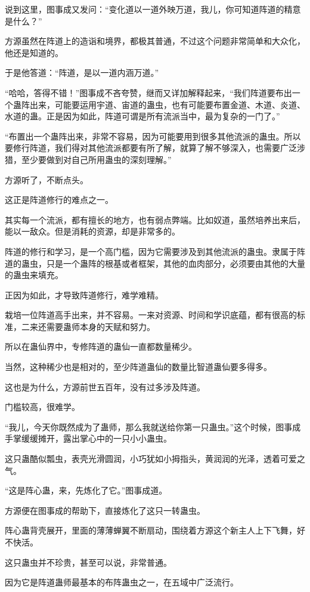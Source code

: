 \begin{this_body}
说到这里，图事成又发问：“变化道以一道外映万道，我儿，你可知道阵道的精意是什么？”

方源虽然在阵道上的造诣和境界，都极其普通，不过这个问题非常简单和大众化，他还是知道的。

于是他答道：“阵道，是以一道内涵万道。”

“哈哈，答得不错！”图事成不吝夸赞，继而又详加解释起来，“我们阵道要布出一个蛊阵出来，可能要运用宇道、宙道的蛊虫，也有可能要布置金道、木道、炎道、水道的蛊。正是因为如此，阵道可谓是所有流派当中，最为复杂的一门了。”

“布置出一个蛊阵出来，非常不容易，因为可能要用到很多其他流派的蛊虫。所以要修行阵道，我们得对其他流派都要有所了解，就算了解不够深入，也需要广泛涉猎，至少要做到对自己所用蛊虫的深刻理解。”

方源听了，不断点头。

这正是阵道修行的难点之一。

其实每一个流派，都有擅长的地方，也有弱点弊端。比如奴道，虽然培养出来后，能以一敌众。但是消耗的资源，却是非常多的。

阵道的修行和学习，是一个高门槛，因为它需要涉及到其他流派的蛊虫。隶属于阵道的蛊虫，只是一个蛊阵的根基或者框架，其他的血肉部分，必须要由其他的大量的蛊虫来填充。

正因为如此，才导致阵道修行，难学难精。

栽培一位阵道高手出来，并不容易。一来对资源、时间和学识底蕴，都有很高的标准，二来还需要蛊师本身的天赋和努力。

所以在蛊仙界中，专修阵道的蛊仙一直都数量稀少。

当然，这种稀少也是相对的，至少阵道蛊仙的数量比智道蛊仙要多得多。

这也是为什么，方源前世五百年，没有过多涉及阵道。

门槛较高，很难学。

“我儿，今天你既然成为了蛊师，那么我就送给你第一只蛊虫。”这个时候，图事成手掌缓缓摊开，露出掌心中的一只小小蛊虫。

这只蛊酷似瓢虫，表壳光滑圆润，小巧犹如小拇指头，黄润润的光泽，透着可爱之气。

“这是阵心蛊，来，先炼化了它。”图事成道。

方源便在图事成的帮助下，直接炼化了这只一转蛊虫。

阵心蛊背壳展开，里面的薄薄蝉翼不断扇动，围绕着方源这个新主人上下飞舞，好不快活。

这只蛊虫并不珍贵，甚至可以说，非常普通。

因为它是阵道蛊师最基本的布阵蛊虫之一，在五域中广泛流行。


\end{this_body}
